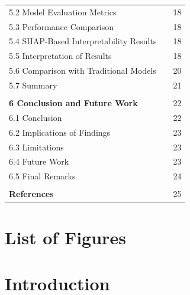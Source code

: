 \documentclass[a4paper,11pt,oneside]{book}
\begin{document}
\begin{flushleft}
\begin{tabularx}{\textwidth}{@{}lXr@{}}
\hspace{1em}5.2 Model Evaluation Metrics & & 18 \\
\hspace{1em}5.3 Performance Comparison & & 18 \\
\hspace{1em}5.4 SHAP-Based Interpretability Results & & 18 \\
\hspace{1em}5.5 Interpretation of Results & & 18 \\
\hspace{1em}5.6 Comparison with Traditional Models & & 20 \\
\hspace{1em}5.7 Summary & & 21 \\
\\
\textbf{6 Conclusion and Future Work} & & 22 \\
\hspace{1em}6.1 Conclusion & & 22 \\
\hspace{1em}6.2 Implications of Findings & & 23 \\
\hspace{1em}6.3 Limitations & & 23 \\
\hspace{1em}6.4 Future Work & & 23 \\
\hspace{1em}6.5 Final Remarks & & 24 \\
\\
\textbf{References} & & 25 \\
\end{tabularx}
\end{flushleft}

\newpage


\chapter*{List of Figures}
\vspace{1em}

\listoffigures

\newpage



\chapter{Introduction}
\end{document}

